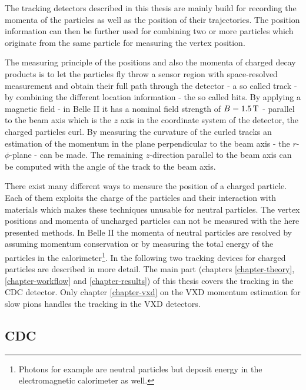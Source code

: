 The tracking detectors described in this thesis are mainly build for recording the momenta of the particles as well as the position of their trajectories. The position information can then be further used for combining two or more particles which originate from the same particle for measuring the vertex position. %

The measuring principle of the positions and also the momenta of charged decay products is to let the particles fly throw a sensor region with space-resolved measurement and obtain their full path through the detector - a so called track - by combining the different location information - the so called hits. By applying a magnetic field - in Belle II it has a nominal field strength of $B = \unit[1.5]{T}$ - parallel to the beam axis which is the $z$ axis in the coordinate system of the detector, the charged particles curl. By measuring the curvature of the curled tracks an estimation of the momentum in the plane perpendicular to the beam axis - the $r$-$\phi$-plane - can be made. The remaining $z$-direction parallel to the beam axis can be computed with the angle of the track to the beam axis.

There exist many different ways to measure the position of a charged particle. Each of them exploits the charge of the particles and their interaction with materials which makes these techniques unusable for neutral particles. The vertex positions and momenta of uncharged particles can not be measured with the here presented methods. In Belle II the momenta of neutral particles are resolved by assuming momentum conservation or by measuring the total energy of the particles in the calorimeter\footnote{Photons for example are neutral particles but deposit energy in the electromagnetic calorimeter as well.}. In the following two tracking devices for charged particles are described in more detail. The main part (chapters \ref{chapter-theory}, \ref{chapter-workflow} and \ref{chapter-results}) of this thesis covers the tracking in the CDC detector. Only chapter \ref{chapter-vxd} on the VXD momentum estimation for slow pions handles the tracking in the VXD detectors.

\subsection{CDC}

